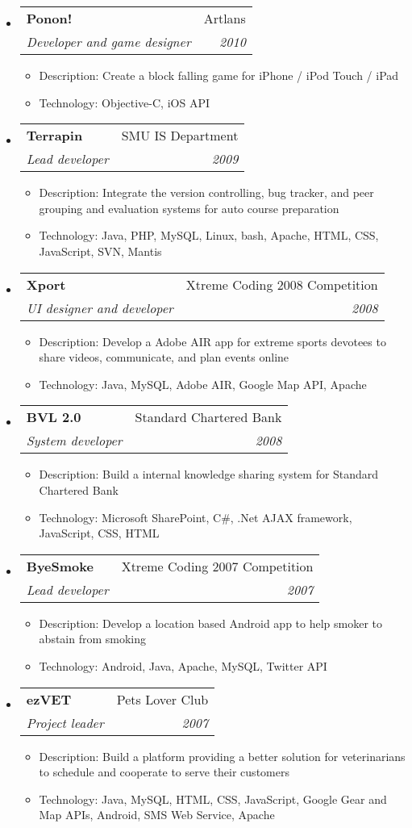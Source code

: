 \documentclass[twoside,letterpaper,11pt]{article}
\makeatletter
\newcommand{\resitem}[1]{\item #1 \vspace{-5pt}}
\newcommand{\resheading}[1]{
  \parbox{\textwidth}{
    \begin{shaded}
      \textbf{\sffamily{\mbox{~}{\large #1} \vphantom{p\^{E}}}}
    \end{shaded}
  }\vspace{-6px}
}
\newcommand{\ressubheading}[4]{
\begin{tabular*}{7in}{l@{\extracolsep{\fill}}r}
		\textbf{#1} & #2 \\
		\textit{#3} & \textit{#4} \\
\end{tabular*}\vspace{-6pt}}
\makeatother
\begin{document}
\resheading{Projects}
\begin{itemize}
\item
	\ressubheading{Ponon!}{Artlans}{Developer and game designer}{2010}
	\begin{itemize}
		\resitem{Description: Create a block falling game for iPhone / iPod Touch / iPad}
		\resitem{Technology: Objective-C, iOS API}
	\end{itemize}

\item 
	\ressubheading{Terrapin}{SMU IS Department}{Lead developer}{2009}
	\begin{itemize}
		\resitem{Description: Integrate the version controlling, bug tracker, and peer grouping and evaluation systems for auto course preparation}
		\resitem{Technology: Java, PHP, MySQL, Linux, bash, Apache, HTML, CSS, JavaScript, SVN, Mantis}
	\end{itemize}

\item
	\ressubheading{Xport}{Xtreme Coding 2008 Competition}{UI designer and developer}{2008}
	\begin{itemize}
		\resitem{Description: Develop a Adobe AIR app for extreme sports devotees to share videos, communicate, and plan events online}
		\resitem{Technology: Java, MySQL, Adobe AIR, Google Map API, Apache}
	\end{itemize}

\item
	\ressubheading{BVL 2.0}{Standard Chartered Bank}{System developer}{2008}
	\begin{itemize}
		\resitem{Description: Build a internal knowledge sharing system for Standard Chartered Bank}
		\resitem{Technology: Microsoft SharePoint, C\#, .Net AJAX framework, JavaScript, CSS, HTML}
	\end{itemize}
\item
	\ressubheading{ByeSmoke}{Xtreme Coding 2007 Competition}{Lead developer}{2007}
	\begin{itemize}
		\resitem{Description: Develop a location based Android app to help smoker to abstain from smoking}
		\resitem{Technology: Android, Java, Apache, MySQL, Twitter API}
	\end{itemize}
\newpage
{}
\item
	\ressubheading{ezVET}{Pets Lover Club}{Project leader}{2007}
	\begin{itemize}
		\resitem{Description: Build a platform providing a better solution for veterinarians to schedule and cooperate to serve their customers}
		\resitem{Technology: Java, MySQL, HTML, CSS, JavaScript, Google Gear and Map APIs, Android, SMS Web Service, Apache}
	\end{itemize}
\end{itemize}
\end{document}
